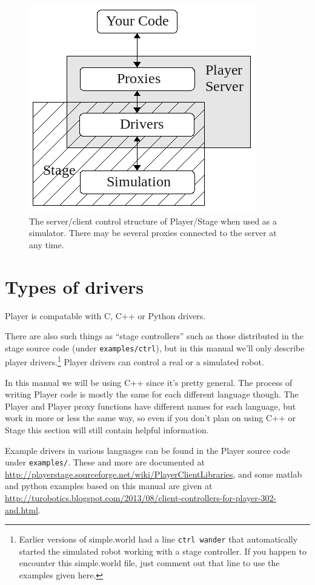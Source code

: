 \documentclass[a4paper]{report}
\newcommand{\plst}{Player/Stage\xspace}
\newcommand{\pl}{Player\xspace}
\begin{document}
\begin{figure}
 	\centering
	\includegraphics[width=0.6\linewidth]{pics/coding/ServerClient_sim.png}
	\caption{The server/client control structure of \plst when used as a simulator. There may be several proxies connected to the server at any time.}
	\label{fig:Coding:ServerClientSim}
\end{figure} 

\section{Types of drivers}
\pl is compatable with C, C++ or Python drivers.  

There are also such things as ``stage controllers'' such as those distributed
in the stage source code (under {\tt examples/ctrl}), but in this manual
we'll only describe player drivers.\footnote{Earlier versions of
simple.world had a line {\tt ctrl wander} that automatically started the
simulated robot working with a stage controller.  If you happen to
encounter this simple.world file, just comment out that line to use the
examples given here.}  Player drivers can control a real or a simulated
robot.

In this manual we will be using C++ since it's pretty general.
The process of writing \pl code is mostly the same for each different
language though. The \pl and \pl proxy functions have different names for
each language, but work in more or less the same way, so even if you don't
plan on using C++ or Stage this section will still contain helpful
information.  

Example drivers in various languages can be found in the Player source code
under {\tt examples/}.  These and more are documented at
\url{http://playerstage.sourceforge.net/wiki/PlayerClientLibraries}, and
some matlab and python examples based on this manual are given at
\url{http://turobotics.blogspot.com/2013/08/client-controllers-for-player-302-and.html}.
\end{document}
